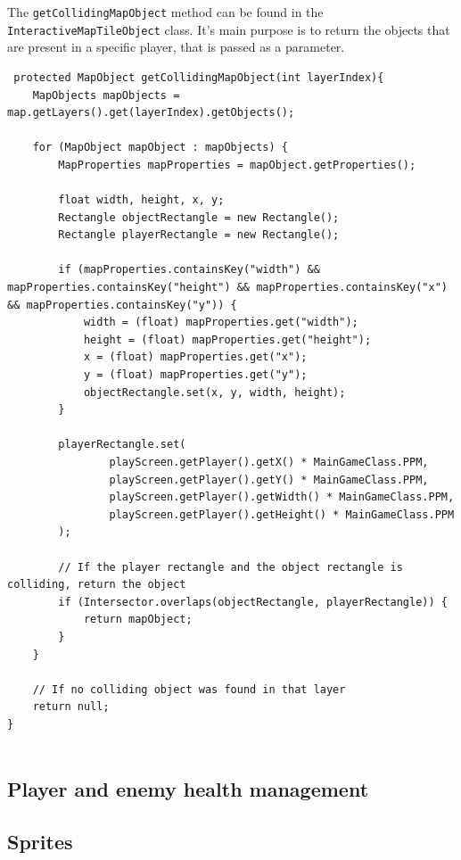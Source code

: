 \documentclass[12p]{article}
\begin{document}
 The \texttt{getCollidingMapObject} method can be found in the \texttt{InteractiveMapTileObject} class. It's main purpose is to return the objects that are present in a specific player, that is passed as a parameter.
 \begin{verbatim}
 protected MapObject getCollidingMapObject(int layerIndex){
    MapObjects mapObjects = map.getLayers().get(layerIndex).getObjects();

    for (MapObject mapObject : mapObjects) {
        MapProperties mapProperties = mapObject.getProperties();

        float width, height, x, y;
        Rectangle objectRectangle = new Rectangle();
        Rectangle playerRectangle = new Rectangle();

        if (mapProperties.containsKey("width") && mapProperties.containsKey("height") && mapProperties.containsKey("x") && mapProperties.containsKey("y")) {
            width = (float) mapProperties.get("width");
            height = (float) mapProperties.get("height");
            x = (float) mapProperties.get("x");
            y = (float) mapProperties.get("y");
            objectRectangle.set(x, y, width, height);
        }

        playerRectangle.set(
                playScreen.getPlayer().getX() * MainGameClass.PPM,
                playScreen.getPlayer().getY() * MainGameClass.PPM,
                playScreen.getPlayer().getWidth() * MainGameClass.PPM,
                playScreen.getPlayer().getHeight() * MainGameClass.PPM
        );

        // If the player rectangle and the object rectangle is colliding, return the object
        if (Intersector.overlaps(objectRectangle, playerRectangle)) {
            return mapObject;
        }
    }

    // If no colliding object was found in that layer
    return null;
}
   
\end{verbatim}

\subsection{Player and enemy health management} \label{DocPlayerAndHealthManagement}


\subsection{Sprites} \label{DocSprites}
\end{document}

